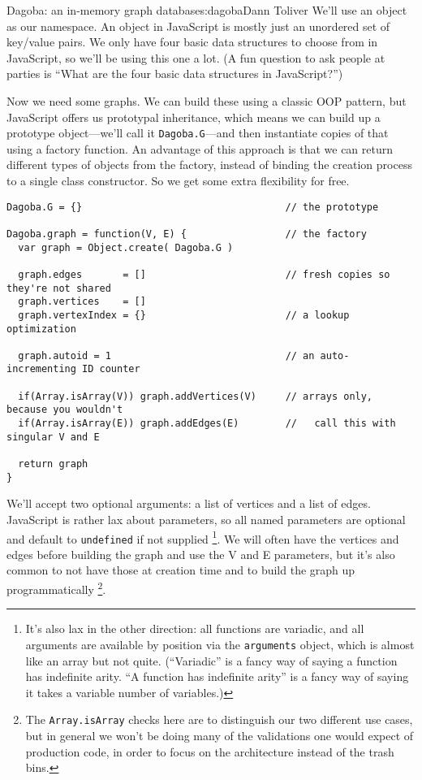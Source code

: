 \begin{aosachapter}{Dagoba: an in-memory graph database}{s:dagoba}{Dann Toliver}
We'll use an object as our namespace. An object in JavaScript is mostly
just an unordered set of key/value pairs. We only have four basic data
structures to choose from in JavaScript, so we'll be using this one a
lot. (A fun question to ask people at parties is ``What are the four
basic data structures in JavaScript?'')

Now we need some graphs. We can build these using a classic OOP pattern,
but JavaScript offers us prototypal inheritance, which means we can
build up a prototype object---we'll call it \texttt{Dagoba.G}---and then
instantiate copies of that using a factory function. An advantage of
this approach is that we can return different types of objects from the
factory, instead of binding the creation process to a single class
constructor. So we get some extra flexibility for free.

\begin{verbatim}
Dagoba.G = {}                                   // the prototype

Dagoba.graph = function(V, E) {                 // the factory
  var graph = Object.create( Dagoba.G )

  graph.edges       = []                        // fresh copies so they're not shared
  graph.vertices    = []
  graph.vertexIndex = {}                        // a lookup optimization

  graph.autoid = 1                              // an auto-incrementing ID counter

  if(Array.isArray(V)) graph.addVertices(V)     // arrays only, because you wouldn't
  if(Array.isArray(E)) graph.addEdges(E)        //   call this with singular V and E

  return graph
}
\end{verbatim}

We'll accept two optional arguments: a list of vertices and a list of
edges. JavaScript is rather lax about parameters, so all named
parameters are optional and default to \texttt{undefined} if not
supplied \footnote{It's also lax in the other direction: all functions
  are variadic, and all arguments are available by position via the
  \texttt{arguments} object, which is almost like an array but not
  quite. (``Variadic'' is a fancy way of saying a function has
  indefinite arity. ``A function has indefinite arity'' is a fancy way
  of saying it takes a variable number of variables.)}. We will often
have the vertices and edges before building the graph and use the V and
E parameters, but it's also common to not have those at creation time
and to build the graph up programmatically \footnote{The
  \texttt{Array.isArray} checks here are to distinguish our two
  different use cases, but in general we won't be doing many of the
  validations one would expect of production code, in order to focus on
  the architecture instead of the trash bins.}.


\end{aosachapter}
